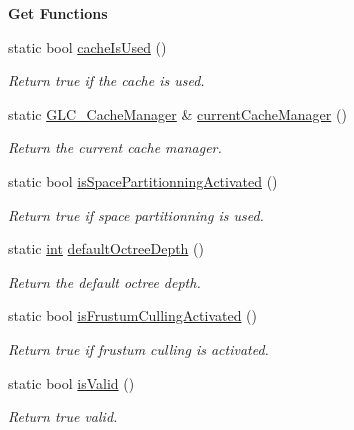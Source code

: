 \begin{Indent}{\bf Get Functions}
\begin{DoxyCompactItemize}
static bool \hyperlink{class_g_l_c___state_a44cd83dbc4738de0ae7592aa3b174169}{cache\-Is\-Used} ()
\begin{DoxyCompactList}\small\item\em Return true if the cache is used. \end{DoxyCompactList}\item 
static \hyperlink{class_g_l_c___cache_manager}{G\-L\-C\-\_\-\-Cache\-Manager} \& \hyperlink{class_g_l_c___state_aeb6829264dd6e460bb4b177bb6333213}{current\-Cache\-Manager} ()
\begin{DoxyCompactList}\small\item\em Return the current cache manager. \end{DoxyCompactList}\item 
static bool \hyperlink{class_g_l_c___state_a203bf526e7796bbf75a0d75c50105d6f}{is\-Space\-Partitionning\-Activated} ()
\begin{DoxyCompactList}\small\item\em Return true if space partitionning is used. \end{DoxyCompactList}\item 
static \hyperlink{ioapi_8h_a787fa3cf048117ba7123753c1e74fcd6}{int} \hyperlink{class_g_l_c___state_ac58c378fffc72d7d3b18f45ea3a6cdd3}{default\-Octree\-Depth} ()
\begin{DoxyCompactList}\small\item\em Return the default octree depth. \end{DoxyCompactList}\item 
static bool \hyperlink{class_g_l_c___state_a843b1b18e5651b56cf9e6a56398c1689}{is\-Frustum\-Culling\-Activated} ()
\begin{DoxyCompactList}\small\item\em Return true if frustum culling is activated. \end{DoxyCompactList}\item 
static bool \hyperlink{class_g_l_c___state_a162929ebdaf0a67d01ec4205642b1c82}{is\-Valid} ()
\begin{DoxyCompactList}\small\item\em Return true valid. \end{DoxyCompactList}\end{DoxyCompactItemize}
\end{Indent}
